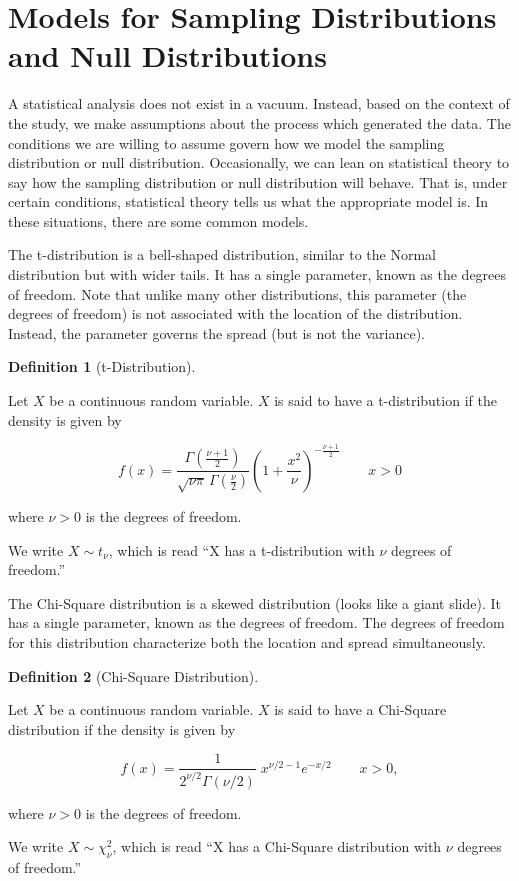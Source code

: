 \documentclass[
  letterpaper,
  DIV=11,
  numbers=noendperiod]{scrreprt}
\theoremstyle{definition}
\newtheorem{definition}{Definition}[chapter]
\theoremstyle{definition}
\theoremstyle{remark}
\begin{document}
\hypertarget{models-for-sampling-distributions-and-null-distributions}{%
\section{Models for Sampling Distributions and Null
Distributions}\label{models-for-sampling-distributions-and-null-distributions}}

A statistical analysis does not exist in a vacuum. Instead, based on the
context of the study, we make assumptions about the process which
generated the data. The conditions we are willing to assume govern how
we model the sampling distribution or null distribution. Occasionally,
we can lean on statistical theory to say how the sampling distribution
or null distribution will behave. That is, under certain conditions,
statistical theory tells us what the appropriate model is. In these
situations, there are some common models.

The t-distribution is a bell-shaped distribution, similar to the Normal
distribution but with wider tails. It has a single parameter, known as
the degrees of freedom. Note that unlike many other distributions, this
parameter (the degrees of freedom) is not associated with the location
of the distribution. Instead, the parameter governs the spread (but is
not the variance).

\begin{definition}[t-Distribution]\protect\hypertarget{def-t-distribution}{}\label{def-t-distribution}

Let \(X\) be a continuous random variable. \(X\) is said to have a
t-distribution if the density is given by

\[f(x) = \frac{\Gamma \left(\frac{\nu+1}{2} \right)} {\sqrt{\nu\pi}\,\Gamma \left(\frac{\nu}{2} \right)} \left(1+\frac{x^2}{\nu} \right)^{-\frac{\nu+1}{2}} \qquad x > 0\]

where \(\nu > 0\) is the degrees of freedom.

We write \(X \sim t_{\nu}\), which is read ``X has a t-distribution with
\(\nu\) degrees of freedom.''

\end{definition}

The Chi-Square distribution is a skewed distribution (looks like a giant
slide). It has a single parameter, known as the degrees of freedom. The
degrees of freedom for this distribution characterize both the location
and spread simultaneously.

\begin{definition}[Chi-Square
Distribution]\protect\hypertarget{def-chi-square-distribution}{}\label{def-chi-square-distribution}

Let \(X\) be a continuous random variable. \(X\) is said to have a
Chi-Square distribution if the density is given by

\[f(x) = \frac{1}{2^{\nu/2}\Gamma (\nu/2)}\;x^{\nu/2-1}e^{-x/2} \qquad x > 0,\]

where \(\nu > 0\) is the degrees of freedom.

We write \(X \sim \chi^2_{\nu}\), which is read ``X has a Chi-Square
distribution with \(\nu\) degrees of freedom.''

\end{definition}
\end{document}
